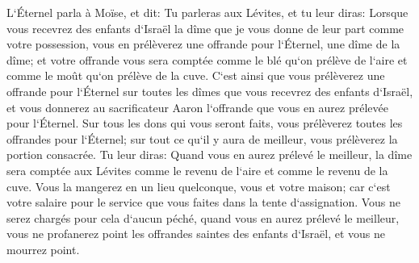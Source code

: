 \verse L`Éternel parla à Moïse, et dit: 
\verse Tu parleras aux Lévites, et tu leur diras: Lorsque vous recevrez des enfants d`Israël la dîme que je vous donne de leur part comme votre possession, vous en prélèverez une offrande pour l`Éternel, une dîme de la dîme; 
\verse et votre offrande vous sera comptée comme le blé qu`on prélève de l`aire et comme le moût qu`on prélève de la cuve. 
\verse C`est ainsi que vous prélèverez une offrande pour l`Éternel sur toutes les dîmes que vous recevrez des enfants d`Israël, et vous donnerez au sacrificateur Aaron l`offrande que vous en aurez prélevée pour l`Éternel. 
\verse Sur tous les dons qui vous seront faits, vous prélèverez toutes les offrandes pour l`Éternel; sur tout ce qu`il y aura de meilleur, vous prélèverez la portion consacrée. 
\verse Tu leur diras: Quand vous en aurez prélevé le meilleur, la dîme sera comptée aux Lévites comme le revenu de l`aire et comme le revenu de la cuve. 
\verse Vous la mangerez en un lieu quelconque, vous et votre maison; car c`est votre salaire pour le service que vous faites dans la tente d`assignation. 
\verse Vous ne serez chargés pour cela d`aucun péché, quand vous en aurez prélevé le meilleur, vous ne profanerez point les offrandes saintes des enfants d`Israël, et vous ne mourrez point. 

\chapter{}

